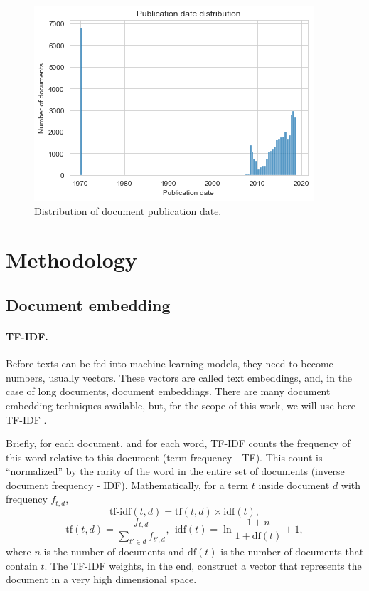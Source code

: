 \documentclass[twocolumn]{article}
\begin{document}
                  \begin{figure}[H]
                        \includegraphics[width=\linewidth]{dates.png}
                        \caption{Distribution of document publication date.}
                        \label{fig:dates}
                  \end{figure}

      \section{Methodology}
            \label{sec:methodology}

            \subsection{Document embedding}
                  \label{sec:document_embedding}

                  \paragraph{TF-IDF.} Before texts can be fed into machine learning models, they need to become numbers, usually vectors. These vectors are called text embeddings, and, in the case of long documents, document embeddings. There are many document embedding techniques available, but, for the scope of this work, we will use here TF-IDF \cite{robertson2004understanding}.

                  Briefly, for each document, and for each word, TF-IDF counts the frequency of this word relative to this document (term frequency - TF). This count is ``normalized'' by the rarity of the word in the entire set of documents (inverse document frequency - IDF). Mathematically, for a term $t$ inside document $d$ with frequency $f_{t, d}$,
                  \[\text{tf-idf}(t, d) = \text{tf}(t, d) \times \text{idf}(t),\]
                  \[\text{tf}(t, d) = \frac{f_{t, d}}{\sum_{t' \in d} f_{t', d}}, \ \ \text{idf}(t) = \ln \frac{1+n}{1+\text{df}(t)}+1,\]                  
                  where $n$ is the number of documents and $\text{df}(t)$ is the number of documents that contain $t$. The TF-IDF weights, in the end, construct a vector that represents the document in a very high dimensional space.
\end{document}
